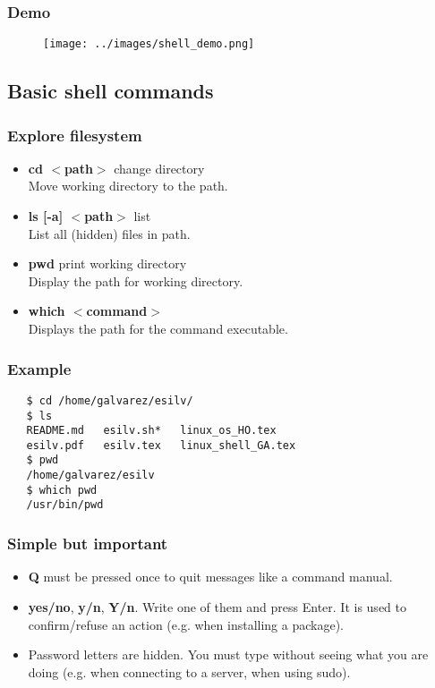 \begin{frame}
   \frametitle{Demo}
   \begin{figure}
      \centering
      \texttt{[image: ../images/shell\_demo.png]}
   \end{figure}
\end{frame}

\subsection{Basic shell commands}

\begin{frame}
\frametitle{Explore filesystem}
   \begin{itemize}
      \item {\bf cd $<$path$>$} change directory \\
            Move working directory to the path.
      \item {\bf ls [-a] $<$path$>$} list \\
            List all (hidden) files in path.
      \item {\bf pwd} print working directory \\
            Display the path for working directory.
      \item {\bf which $<$command$>$} \\
            Displays the path for the command executable.
   \end{itemize}
\end{frame}

\begin{frame}[fragile]
   \frametitle{Example}
   \begin{verbatim}
   $ cd /home/galvarez/esilv/
   $ ls
   README.md   esilv.sh*   linux_os_HO.tex
   esilv.pdf   esilv.tex   linux_shell_GA.tex
   $ pwd
   /home/galvarez/esilv
   $ which pwd
   /usr/bin/pwd
   \end{verbatim}
\end{frame}

\begin{frame}
   \frametitle{Simple but important}
   \begin{itemize}
      \item \textbf{Q} must be pressed once to quit messages like a command manual.
      \item \textbf{yes/no}, \textbf{y/n}, \textbf{Y/n}. Write one of them and press Enter. It is used to confirm/refuse an action (e.g. when installing a package).
      \item Password letters are hidden. You must type without seeing what you are doing (e.g. when connecting to a server, when using sudo).
   \end{itemize}
\end{frame}

